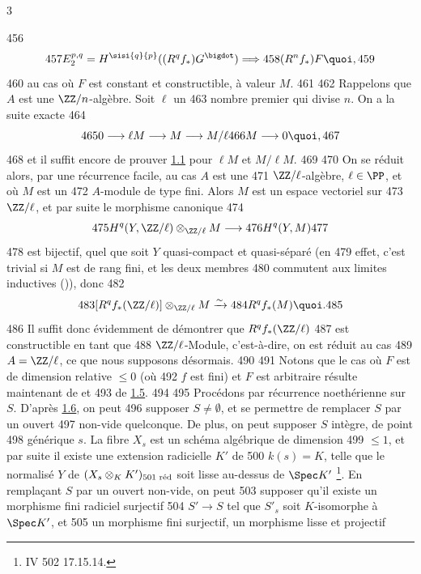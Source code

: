 3	\documentclass[10pt]{../fichiers-configuration-latex/smfart}
\begin{document}
   456	$$
   457	E^{p,q}_2=H^{\sisi{q}{p}}((R^{q}f_{\ast})G^{\bigdot})\Longrightarrow
   458	(R^{n}f_{\ast})F{\quoi},
   459	$$
   460	au cas où $F$ est constant et constructible, à valeur $M$.
   461	
   462	Rappelons que $A$ est une $\ZZ/n$-algèbre. Soit $\ell$ un
   463	nombre premier qui divise $n$. On a la suite exacte
   464	$$
   465	0\longrightarrow \ell M\longrightarrow M\longrightarrow M/\ell
   466	M\longrightarrow 0{\quoi},
   467	$$
   468	et il suffit encore de prouver \hyperref[XIV.thm1.1]{1.1} pour $\ell M$ et $M/\ell M$.
   469	
   470	On se réduit alors, par une récurrence facile, au cas $A$ est une
   471	$\ZZ/\ell$-algèbre, $\ell \in \PP$, et où $M$ est un
   472	$A$-module de type fini. Alors $M$ est un espace vectoriel sur
   473	$\ZZ/\ell$, et par suite le morphisme canonique
   474	$$
   475	H^{q}(Y,\ZZ/\ell)\otimes_{\ZZ/\ell}M\longrightarrow
   476	H^{q}(Y,M)
   477	$$
   478	est bijectif, quel que soit $Y$ quasi-compact et quasi-séparé (en
   479	effet, c'est trivial si $M$ est de rang fini, et les deux membres
   480	commutent aux limites inductives	()), donc
   482	$$
   483	[R^{q}f_{\ast}(\ZZ/\ell)]\otimes_{\ZZ/\ell}M\xrightarrow{\sim}
   484	R^{q}f_{\ast}(M){\quoi}.
   485	$$
   486	Il suffit donc évidemment de démontrer que $R^{q}f_{\ast}(\ZZ/\ell)$
   487	est constructible en tant que
   488	$\ZZ/\ell$-Module, c'est-à-dire, on est réduit au cas
   489	$A=\ZZ/\ell$, ce que nous supposons désormais.
   490	
   491	Notons que le cas où $F$ est de dimension relative $\leq 0$ (\ie où
   492	$f$ est fini) et $F$ est arbitraire résulte maintenant de  et
   493	de \hyperref[XIV.lem1.5]{1.5}.
   494	
   495	Procédons par récurrence noethérienne sur $S$. D'après \hyperref[XIV.lem1.6]{1.6}, on peut
   496	supposer $S\neq ∅$, et se permettre de remplacer $S$ par un ouvert
   497	non-vide quelconque. De plus, on peut supposer $S$ intègre, de point
   498	générique $s$. La fibre $X_s$ est un schéma algébrique de dimension
   499	$\leq 1$, et par suite il existe une extension radicielle $K'$ de
   500	$k(s)=K$, telle que le normalisé $Y$ de $(X_s\otimes_K K')_{\text{\rm
   501	réd}}$ soit lisse au-dessus de $\Spec K'$ \footnote[1]{\Cf \EGA IV
   502	17.15.14.}. En remplaçant $S$ par un ouvert non-vide, on peut
   503	supposer qu'il existe un morphisme fini radiciel surjectif
   504	$S'\rightarrow S$ tel que $S'_s$ soit $K$-isomorphe à $\Spec K'$, et
   505	un morphisme fini surjectif, un morphisme lisse et projectif
\end{document}

